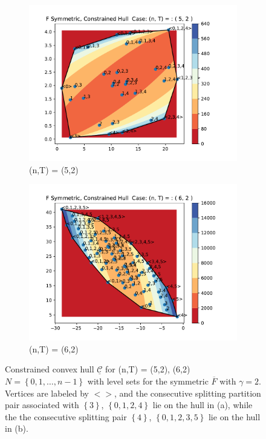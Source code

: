 \documentclass{article}
\theoremstyle{case}
\begin{document}
\begin{figure}
\centering
\begin{subfigure}{.5\textwidth}
  \centering
  \includegraphics[scale=.55]{const_hull_5_2.pdf}
  \caption{(n,T) = (5,2)}
  \label{fig:sub1}
\end{subfigure}%
\begin{subfigure}{.5\textwidth}
  \centering
  \includegraphics[scale=.55]{const_hull_6_2.pdf}
  \caption{(n,T) = (6,2)}
  \label{fig:sub2}
\end{subfigure}
\caption{Constrained convex hull $\underline{\mathcal{C}}$ for (n,T) = (5,2), (6,2) $N = \left\lbrace 0,1, \dots, n-1 \right\rbrace$ with level sets for the symmetric $\overline{F}$ with $\gamma = 2$. Vertices are labeled by $<>$, and the consecutive splitting partition pair associated with $\left\lbrace 3\right\rbrace$, $\left\lbrace 0, 1, 2, 4\right\rbrace$ lie on the hull in (a), while the the consecutive splitting pair $\left\lbrace 4\right\rbrace$, $\left\lbrace 0, 1, 2, 3, 5\right\rbrace$ lie on the hull in (b).}
\label{fig:hull1}
\end{figure}
\end{document}
